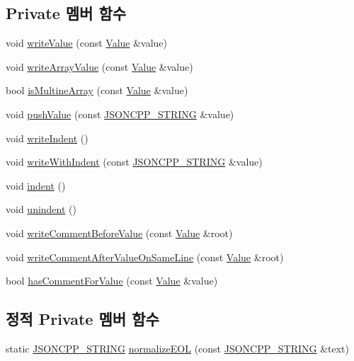 \subsection*{Private 멤버 함수}
\begin{DoxyCompactItemize}
\item 
void \hyperlink{class_json_1_1_styled_stream_writer_a4359250e09273fa0144021684be001ae}{write\+Value} (const \hyperlink{class_json_1_1_value}{Value} \&value)
\item 
void \hyperlink{class_json_1_1_styled_stream_writer_a606f2ddd58093c9b019d452c1b6f09fe}{write\+Array\+Value} (const \hyperlink{class_json_1_1_value}{Value} \&value)
\item 
bool \hyperlink{class_json_1_1_styled_stream_writer_a88f4d342cf25c73aabf77c1b8ba01e44}{is\+Multine\+Array} (const \hyperlink{class_json_1_1_value}{Value} \&value)
\item 
void \hyperlink{class_json_1_1_styled_stream_writer_a9adb47185695f07b1979d8f4c5347592}{push\+Value} (const \hyperlink{json_8h_a1e723f95759de062585bc4a8fd3fa4be}{J\+S\+O\+N\+C\+P\+P\+\_\+\+S\+T\+R\+I\+NG} \&value)
\item 
void \hyperlink{class_json_1_1_styled_stream_writer_a5a52fa5b406f1580a61dde3b5638e76d}{write\+Indent} ()
\item 
void \hyperlink{class_json_1_1_styled_stream_writer_a4e64789373b359c9b7a7244509b918fc}{write\+With\+Indent} (const \hyperlink{json_8h_a1e723f95759de062585bc4a8fd3fa4be}{J\+S\+O\+N\+C\+P\+P\+\_\+\+S\+T\+R\+I\+NG} \&value)
\item 
void \hyperlink{class_json_1_1_styled_stream_writer_ab49409578422aa73b060e3492dd6c72a}{indent} ()
\item 
void \hyperlink{class_json_1_1_styled_stream_writer_a74d8fb9beecd29759d7b79f430386358}{unindent} ()
\item 
void \hyperlink{class_json_1_1_styled_stream_writer_a79c3c2b320475035c47b2db484a3e434}{write\+Comment\+Before\+Value} (const \hyperlink{class_json_1_1_value}{Value} \&root)
\item 
void \hyperlink{class_json_1_1_styled_stream_writer_ad2ca860e317ca91d6b2932535b4ce9c7}{write\+Comment\+After\+Value\+On\+Same\+Line} (const \hyperlink{class_json_1_1_value}{Value} \&root)
\item 
bool \hyperlink{class_json_1_1_styled_stream_writer_ad2892f57171919fa4f8a5ae5574755cf}{has\+Comment\+For\+Value} (const \hyperlink{class_json_1_1_value}{Value} \&value)
\end{DoxyCompactItemize}
\subsection*{정적 Private 멤버 함수}
\begin{DoxyCompactItemize}
\item 
static \hyperlink{json_8h_a1e723f95759de062585bc4a8fd3fa4be}{J\+S\+O\+N\+C\+P\+P\+\_\+\+S\+T\+R\+I\+NG} \hyperlink{class_json_1_1_styled_stream_writer_ae481322d7a439881b257ba7aeda6d19b}{normalize\+E\+OL} (const \hyperlink{json_8h_a1e723f95759de062585bc4a8fd3fa4be}{J\+S\+O\+N\+C\+P\+P\+\_\+\+S\+T\+R\+I\+NG} \&text)
\end{DoxyCompactItemize}
